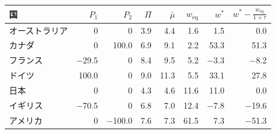 \begin{tabular}{lrrrrrrr}
\toprule
国 & $P_{1}$ & $P_{2}$ & $\Pi$ & $\bar\mu$ & $w_{\mathrm{eq}}$ & $w^*$ & $w^* - \frac{w_{\mathrm{eq}}}{1+\tau}$ \\
\midrule
オーストラリア & 0 & 0 & 3.9 & 4.4 & 1.6 & 1.5 & 0.0 \\
カナダ & 0 & 100.0 & 6.9 & 9.1 & 2.2 & 53.3 & 51.3 \\
フランス & \ensuremath{-}29.5 & 0 & 8.4 & 9.5 & 5.2 & \ensuremath{-}3.3 & \ensuremath{-}8.2 \\
ドイツ & 100.0 & 0 & 9.0 & 11.3 & 5.5 & 33.1 & 27.8 \\
日本 & 0 & 0 & 4.3 & 4.6 & 11.6 & 11.0 & 0.0 \\
イギリス & \ensuremath{-}70.5 & 0 & 6.8 & 7.0 & 12.4 & \ensuremath{-}7.8 & \ensuremath{-}19.6 \\
アメリカ & 0 & \ensuremath{-}100.0 & 7.6 & 7.3 & 61.5 & 7.3 & \ensuremath{-}51.3 \\
\bottomrule
\end{tabular}
